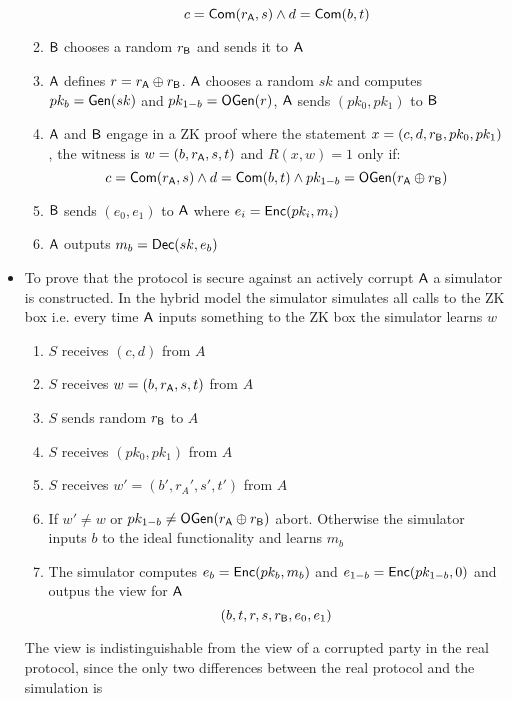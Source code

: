\begin{itemize}
\begin{enumerate}
        \begin{equation*}
            c = \mathsf{Com}(r_{\mathsf{A}}, s) \land d = \mathsf{Com}(b,t)
        \end{equation*}
        \item $\mathsf{B}$ chooses a random $r_{\mathsf{B}}$ and sends it to $\mathsf{A}$
        \item $\mathsf{A}$ defines $r = r_{\mathsf{A}} \oplus r_{\mathsf{B}}$. $\mathsf{A}$ chooses a random $sk$ and computes $pk_b = \mathsf{Gen}(sk)$ and $pk_{1-b} = \mathsf{OGen}(r)$, $\mathsf{A}$ sends $(pk_0, pk_1)$ to $\mathsf{B}$
        \item $\mathsf{A}$ and $\mathsf{B}$ engage in a ZK proof where the statement  $x = (c,d, r_{\mathsf{B}}, pk_0, pk_1)$, the witness is $w = (b, r_{\mathsf{A}}, s, t)$ and $R(x,w) = 1$ only if:
        \begin{equation*}
            c = \mathsf{Com}(r_{\mathsf{A}}, s) \land d =\mathsf{Com}(b,t) \land pk_{1-b} = \mathsf{OGen}(r_{\mathsf{A}} \oplus r_{\mathsf{B}})
        \end{equation*}
        \item $\mathsf{B}$ sends $(e_0, e_1)$ to $\mathsf{A}$ where $e_i = \mathsf{Enc}(pk_i, m_i)$
        \item $\mathsf{A}$ outputs $m_b = \mathsf{Dec}(sk, e_b)$
    \end{enumerate}
    \item To prove that the protocol is secure against an actively corrupt $\mathsf{A}$ a simulator is constructed. In the hybrid model the simulator simulates all calls to the ZK box i.e. every time $\mathsf{A}$ inputs something to the ZK box the simulator learns $w$
    \begin{enumerate}
        \item $S$ receives $(c,d)$ from $A$
        \item $S$ receives $w=(b,r_{\mathsf{A}}, s,t)$ from $A$ 
        \item $S$ sends random $r_{\mathsf{B}}$ to $A$
        \item $S$ receives $(pk_0, pk_1)$ from $A$
        \item $S$ receives $w' = (b', r_A', s', t')$ from $A$
        \item If $w' \neq w$ or $pk_{1-b} \neq \mathsf{OGen}(r_{\mathsf{A}} \oplus r_{\mathsf{B}})$ abort. Otherwise the simulator inputs $b$ to the ideal functionality and learns $m_b$
        \item The simulator computes $e_b = \mathsf{Enc}(pk_b, m_b)$ and $e_{1-b} = \mathsf{Enc}(pk_{1-b}, 0)$ and outpus the view for $\mathsf{A}$
        \begin{equation*}
            (b,t,r,s,r_{\mathsf{B}}, e_0, e_1)
        \end{equation*}
    \end{enumerate}
    The view is indistinguishable from the view of a corrupted party in the real protocol, since the only two differences between the real protocol and the simulation is

\end{itemize}
